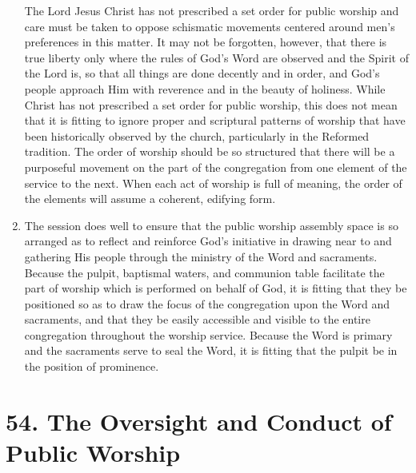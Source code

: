 \documentclass[
]{book}
\begin{document}
\begin{enumerate}
  The Lord Jesus Christ has not prescribed a set order for public worship and care must be taken to oppose schismatic movements centered around men's preferences in this matter. It may not be forgotten, however, that there is true liberty only where the rules of God's Word are observed and the Spirit of the Lord is, so that all things are done decently and in order, and God's people approach Him with reverence and in the beauty of holiness. While Christ has not prescribed a set order for public worship, this does not mean that it is fitting to ignore proper and scriptural patterns of worship that have been historically observed by the church, particularly in the Reformed tradition. The order of worship should be so structured that there will be a purposeful movement on the part of the congregation from one element of the service to the next. When each act of worship is full of meaning, the order of the elements will assume a coherent, edifying form.
\item
  The session does well to ensure that the public worship assembly space is so arranged as to reflect and reinforce God's initiative in drawing near to and gathering His people through the ministry of the Word and sacraments. Because the pulpit, baptismal waters, and communion table facilitate the part of worship which is performed on behalf of God, it is fitting that they be positioned so as to draw the focus of the congregation upon the Word and sacraments, and that they be easily accessible and visible to the entire congregation throughout the worship service. Because the Word is primary and the sacraments serve to seal the Word, it is fitting that the pulpit be in the position of prominence.
\end{enumerate}

\hypertarget{the-oversight-and-conduct-of-public-worship}{%
\section*{54. The Oversight and Conduct of Public Worship}\label{the-oversight-and-conduct-of-public-worship}}

\protect\hypertarget{chapter-slug-54-the-oversight-and-conduct-of-public-worship}{\href{}{}}
\end{document}
